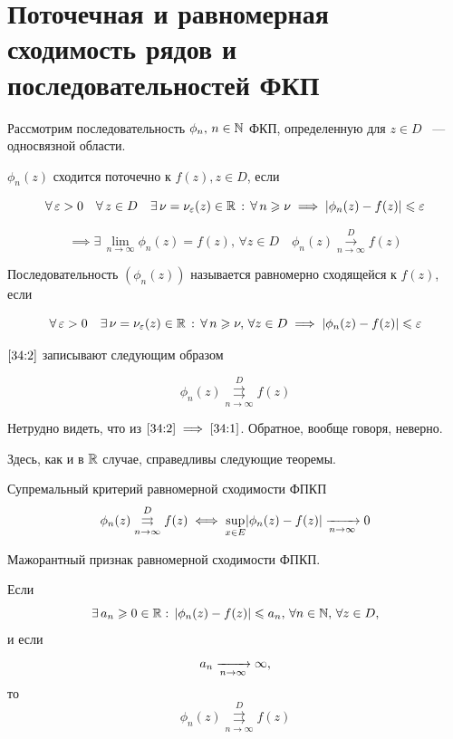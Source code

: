 \documentclass[../../main.tex]{subfiles}
\begin{document}
\section{Поточечная и равномерная сходимость рядов и последовательностей ФКП}

Рассмотрим последовательность $ \phi_n,\, n \in \mathbb{N} $ ФКП, определенную для $ z \in D $ ~--- односвязной области.

$ \phi_n(z) $ сходится поточечно к $ f(z), z \in D $, если

\begin{equation}\label{34:1}
	\forall\, \varepsilon > 0 \quad \forall\, z \in D \quad \exists\, \nu = \nu_\varepsilon (z) \in \mathbb{R}\, :\, \forall\, n \geqslant \nu \implies |\phi_n(z) - f(z)| \leqslant \varepsilon
\end{equation}

\[ \implies \exists\, \underset{n \to \infty}{\lim} \phi_n (z) = f(z),\, \forall z \in D \quad \phi_n(z) \overset{D}{\underset{n \to \infty}\longrightarrow} f(z) \]

Последовательность $ (\phi_n(z)) $ называется равномерно сходящейся к $ f(z) $, если

\begin{equation}\label{34:2}
	\forall\, \varepsilon > 0 \quad \exists\, \nu = \nu_\varepsilon (z) \in \mathbb{R}\, :\, \forall\, n \geqslant \nu,\, \forall z \in D \implies |\phi_n(z) - f(z)| \leqslant \varepsilon
\end{equation}

$ \eqref{34:2} $ записывают следующим образом

\[ \phi_n(z) \overset{D}{\underset{n \to \infty}\rightrightarrows} f(z) \]

Нетрудно видеть, что из $ \eqref{34:2} \implies \eqref{34:1} $. Обратное, вообще говоря, неверно.

Здесь, как и в $\mathbb{R}$ случае, справедливы следующие теоремы.

\begin{thm}{Супремальный критерий равномерной сходимости ФПКП}
	\[ \phi_n(z) \overset{D}{\underset{n \to \infty}\rightrightarrows} f(z) \iff \underset{x \in E}{\sup}|\phi_n(z) - f(z)| \xrightarrow[n \rightarrow \infty]{} 0 \]
\end{thm}

\begin{thm}{Мажорантный признак равномерной сходимости ФПКП.}
	\;
	
	Если 
	\[ \exists\, a_n \geqslant 0 \in \mathbb{R} :\, |\phi_n(z) - f(z)| \leqslant a_n,\, \forall n \in \mathbb{N},\, \forall z \in D, \]
	и если \[ a_n \xrightarrow[n \rightarrow \infty]{} \infty, \]
	то \[ \phi_n(z) \overset{D}{\underset{n \to \infty}\rightrightarrows} f(z) \]
\end{thm}
\end{document}
